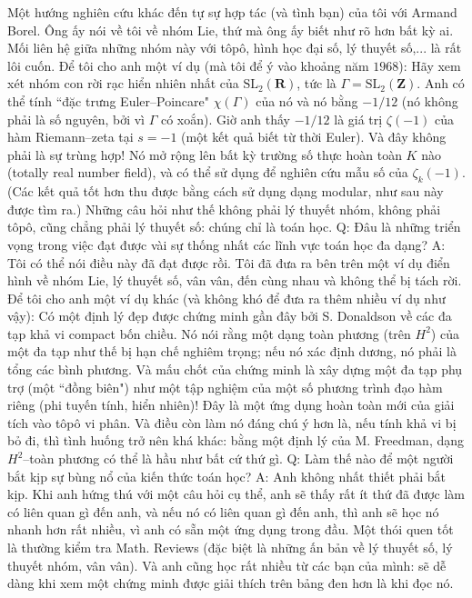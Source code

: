 \begin{multicols}{2}
	\vskip 0.1cm
	Một hướng nghiên cứu khác đến tự sự hợp tác (và tình bạn) của tôi với Armand Borel. Ông ấy nói về tôi về nhóm Lie, thứ mà ông ấy biết như rõ hơn bất kỳ ai. Mối liên hệ giữa những nhóm này với tôpô, hình học đại số, lý thuyết số,... là rất lôi cuốn. Để tôi cho anh một ví dụ (mà tôi để ý vào khoảng năm $1968$):
	\vskip 0.1cm 
	Hãy xem xét nhóm con rời rạc hiển nhiên nhất của $\mathrm{SL}_2(\mathbf{R})$, tức là $\Gamma = \mathrm{SL}_2(\mathbf{Z})$. Anh có thể tính ``đặc trưng Euler--Poincare" $\chi(\Gamma)$ của nó và nó bằng $-1/12$ (nó không phải là số nguyên, bởi vì $\Gamma$ có xoắn). Giờ anh thấy $-1/12$ là giá trị $\zeta(-1)$ của hàm Riemann--zeta tại $s=-1$ (một kết quả biết từ thời Euler). Và đây không phải là sự trùng hợp! Nó mở rộng lên bất kỳ trường số thực hoàn toàn $K$ nào (totally real number field), và có thể sử dụng để nghiên cứu mẫu số của $\zeta_k(-1)$. (Các kết quả tốt hơn thu được bằng cách sử dụng dạng modular, như sau này được tìm ra.) Những câu hỏi như thế không phải lý thuyết nhóm, không phải tôpô, cũng chẳng phải lý thuyết số: chúng chỉ là toán học.
	\vskip 0.1cm
	Q: Đâu là những triển vọng trong việc đạt được vài sự thống nhất các lĩnh vực toán học đa dạng?
	\vskip 0.1cm
	A: Tôi có thể nói điều này đã đạt được rồi. Tôi đã đưa ra bên trên một ví dụ điển hình về nhóm Lie, lý thuyết số, vân vân, đến cùng nhau và không thể bị tách rời. Để tôi cho anh một ví dụ khác (và không khó để đưa ra thêm nhiều ví dụ như vậy): 
	\vskip 0.1cm
	Có một định lý đẹp được chứng minh gần đây bởi S. Donaldson về các đa tạp khả vi compact bốn chiều. Nó nói rằng một dạng toàn phương (trên $H^2$) của một đa tạp như thế bị hạn chế nghiêm trọng; nếu nó xác định dương, nó phải là tổng các bình phương. Và mấu chốt của chứng minh là xây dựng một đa tạp phụ trợ (một ``đồng biên") như một tập nghiệm của một số phương trình đạo hàm riêng (phi tuyến tính, hiển nhiên)! Đây là một ứng dụng hoàn toàn mới của giải tích vào tôpô vi phân. Và điều còn làm nó đáng chú ý hơn là, nếu tính khả vi bị bỏ đi, thì tình huống trở nên khá khác: bằng một định lý của M. Freedman, dạng $H^2$--toàn phương có thể là hầu như bất cứ thứ gì. 
	\vskip 0.1cm
	Q: Làm thế nào để một người bắt kịp sự bùng nổ của kiến thức toán học? 
	\vskip 0.1cm
	A: Anh không nhất thiết phải bắt kịp. Khi anh hứng thú với một câu hỏi cụ thể, anh sẽ thấy rất ít thứ đã được làm có liên quan gì đến anh, và nếu nó có liên quan gì đến anh, thì anh sẽ học nó nhanh hơn rất nhiều, vì anh có sẵn một ứng dụng trong đầu. Một thói quen tốt là thường kiểm tra Math. Reviews (đặc biệt là những ấn bản về lý thuyết số, lý thuyết nhóm, vân vân). Và anh cũng học rất nhiều từ các bạn của mình: sẽ dễ dàng khi xem một chứng minh được giải thích trên bảng đen hơn là khi đọc nó. 

\end{multicols}
